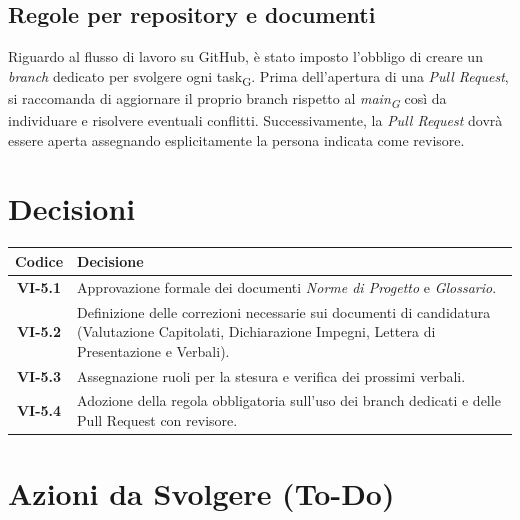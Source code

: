 \subsection{Regole per repository e documenti}
Riguardo al flusso di lavoro su GitHub, è stato imposto l'obbligo di creare un \textit{branch} dedicato per svolgere ogni task\textsubscript{G}. Prima dell'apertura di una \textit{Pull Request}, si raccomanda di aggiornare il proprio branch rispetto al \textit{main\textsubscript{G}} così da individuare e risolvere eventuali conflitti. Successivamente, la \textit{Pull Request} dovrà essere aperta assegnando esplicitamente la persona indicata come revisore.

\newpage
\section{Decisioni}

\begin{table}[ht]
	\centering
	\renewcommand{\arraystretch}{1.5}
	\begin{tabularx}{\textwidth}{c X}
		\toprule
		\textbf{Codice} & \textbf{Decisione} \\
		\midrule
		\textbf{VI-5.1} & Approvazione formale dei documenti \textit{Norme di Progetto} e \textit{Glossario}. \\
		\textbf{VI-5.2} & Definizione delle correzioni necessarie sui documenti di candidatura (Valutazione Capitolati, Dichiarazione Impegni, Lettera di Presentazione e Verbali). \\
		\textbf{VI-5.3} & Assegnazione ruoli per la stesura e verifica dei prossimi verbali. \\
		\textbf{VI-5.4} & Adozione della regola obbligatoria sull'uso dei branch dedicati e delle Pull Request con revisore. \\
		\bottomrule
	\end{tabularx}
\end{table}

\section{Azioni da Svolgere (To-Do)}

